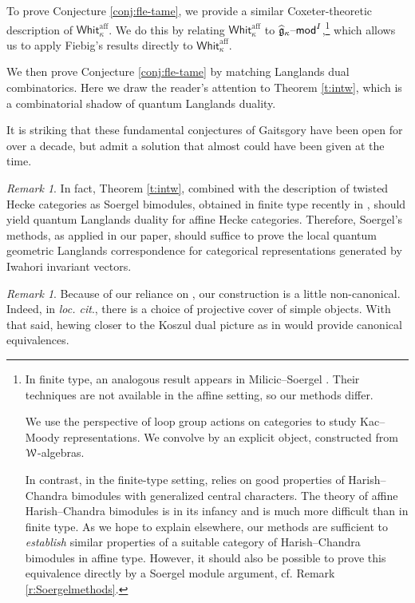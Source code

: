 \documentclass[11pt,reqno]{amsart}
\newcommand{\aff}{\operatorname{aff}}
\newcommand{\fg}{\mathfrak{g}}
\theoremstyle{remark}
\newtheorem{re}[subsubsection]{Remark}
\numberwithin{equation}{section}
\newcommand{\sW}{\EuScript{W}}
\renewcommand{\mod}{\text{\textendash}\mathsf{mod}}
\newcommand{\Whit}{\mathsf{Whit}}
\begin{document}
To prove Conjecture \ref{conj:fle-tame}, we 
provide a similar Coxeter-theoretic 
description of $\Whit_{\kappa}^{\aff}$. 
We do this by relating $\Whit_{\kappa}^{\aff}$ to 
$\widehat{\fg}_{\kappa}\mod^I$,\footnote{In finite type, an analogous
	result appears in Milicic--Soergel \cite{ms}. 
	Their techniques are not available in the affine setting, so our
	methods differ. 
	
	We use the perspective of 
	loop group actions on categories to
	study Kac--Moody representations. We convolve by an explicit object,
	constructed from $\sW$-algebras.
	
	In contrast, in the finite-type setting,
	\cite{ms} relies on good properties
	of Harish--Chandra bimodules with generalized
	central characters. The theory of affine Harish--Chandra 
	bimodules is in its infancy and is
	much more difficult than in finite type.
	As we hope to explain 
	elsewhere, our methods are sufficient to {\em establish} 
	similar properties of a suitable 
	category of Harish--Chandra bimodules in 
	affine type. However, it should also be possible to prove this equivalence 
	directly by a 
Soergel module argument, cf. Remark \ref{r:Soergelmethods}.} which allows us to 
apply Fiebig's results directly to 
$\Whit_{\kappa}^{\aff}$. 

We then prove Conjecture \ref{conj:fle-tame} 
by matching Langlands dual combinatorics. 
Here we draw the reader's attention to 
Theorem \ref{t:intw}, which is
a combinatorial shadow of quantum Langlands duality.

It is striking that these fundamental conjectures of Gaitsgory
have been open for over a decade, but admit a solution that almost
could have been given at the time. 
\begin{re}

In fact, Theorem \ref{t:intw}, combined 
with the description of twisted Hecke categories as Soergel bimodules, obtained 
in finite type recently in \cite{ly}, 
should yield quantum Langlands duality
for affine Hecke categories. 
Therefore, Soergel's methods, as 
applied in our paper, should suffice to 
prove the local quantum geometric 
Langlands correspondence for categorical representations generated by Iwahori 
invariant vectors. 

\end{re}

\begin{re}

Because of our reliance on \cite{fiebig}, our 
construction is a little non-canonical. 
Indeed, in \emph{loc. cit}., 
there is a choice of projective cover of simple
objects. With that said, 
hewing closer to the Koszul dual picture
as in \cite{ly} would provide canonical equivalences.

\end{re}
\end{document}
